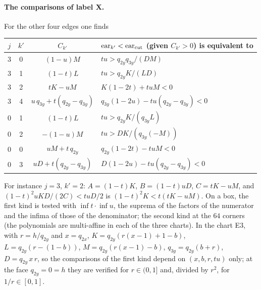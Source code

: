 \documentclass[11pt]{article}
\theoremstyle{remark}
\begin{document}
\paragraph{The comparisons of label X.} For the other four edges one finds
\begin{center}\small\begin{tabular}{@{}cccl@{}}\toprule
$j$ & $k'$ & $C_{k'}$ & $\mathrm{ear}_{k'}<\mathrm{ear}_{\rm cut}$ (given $C_{k'}>0$) is equivalent to\\\midrule
3 & 0 & $(1-u)M$ & $tu>q_{2y}q_{3y}/(DM)$\\
3 & 1 & $(1-t)L$ & $tu>q_{2y}K/(LD)$\\
3 & 2 & $tK-uM$ & $K(1-2t)+tuM<0$\\
3 & 4 & $u\,q_{3y}+t(q_{2y}-q_{3y})$ & $q_{3y}(1-2u)-tu(q_{2y}-q_{3y})<0$\\
0 & 1 & $(1-t)L$ & $tu>q_{2y}K/(q_{3y}L)$\\
0 & 2 & $-(1-u)M$ & $tu>DK/(q_{3y}(-M))$\\
0 & 0 & $uM+t\,q_{2y}$ & $q_{2y}(1-2t)-tuM<0$\\
0 & 3 & $uD+t(q_{2y}-q_{3y})$ & $D(1-2u)-tu(q_{2y}-q_{3y})<0$\\\bottomrule
\end{tabular}\end{center}
For instance $j=3$, $k'=2$: $A=(1-t)K$, $B=(1-t)uD$, $C=tK-uM$, and $(1-t)^2uKD/(2C)<tuD/2$ is $(1-t)^2K<t(tK-uM)$.
On a box, the first kind is tested with $\inf t\cdot\inf u$, the suprema of the factors of the numerator and the
infima of those of the denominator; the second kind at the $64$ corners (the polynomials are multi-affine in each of
the three charts). In the chart E3, with $r=h/q_{2y}$ and $x=q_{2x}$,
$K=q_{2y}(r(x-1)+1-b)$, $L=q_{2y}(r-(1-b))$, $M=q_{2y}(r(x-1)-b)$, $q_{3y}=q_{2y}(b+r)$, $D=q_{2y}\,x\,r$,
so the comparisons of the first kind depend on $(x,b,r,tu)$ only; at the face $q_{2y}=0=h$ they are verified for
$r\in(0,1]$ and, divided by $r^2$, for $1/r\in[0,1]$.
\end{document}
